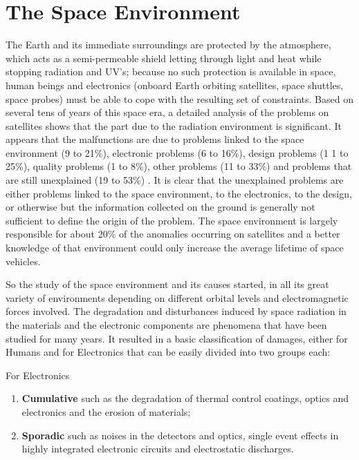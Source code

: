 \documentclass[./dissertation.tex]{subfiles}
\begin{document}
\section{The Space Environment}
The Earth and its immediate surroundings are protected by the atmosphere, which acts as a semi-permeable shield letting through light and heat while stopping radiation and UV's; because no such protection is available in space, human beings and electronics (onboard Earth orbiting satellites, space shuttles, space probes) must be able to cope with the resulting set of constraints. Based on several tens  of years of this  space  era, a detailed analysis of the problems on satellites shows that the part due to the radiation  environment  is  significant. It appears  that  the malfunctions   are   due to problems   linked to the   space environment (9 to 21\%), electronic  problems (6 to 16\%), design  problems (1 1  to 25\%), quality  problems  (1 to 8\%), other   problems (11  to   33\%) and  problems   that are still unexplained (19 to  53\%) \cite{bib2}.  It is clear  that the unexplained problems  are either problems  linked to the space environment, to the electronics, to   the design, or otherwise   but   the information  collected  on  the  ground is generally not sufficient to define the origin  of  the  problem. The space environment is largely  responsible   for   about 20\% of the anomalies  occurring  on  satellites  and a  better  knowledge of that  environment  could  only  increase  the  average lifetime of space vehicles.

So the study of the space environment and its causes started, in all its great variety of environments depending on different orbital levels and electromagnetic forces involved. The  degradation  and  disturbances induced by space radiation in the materials  and the  electronic  components are phenomena that  have  been  studied for many  years.\cite{bib2} It resulted in a basic classification of damages, either for Humans and for Electronics that can be easily divided into two groups each:

For Electronics
\begin{enumerate}
    \item \textbf{Cumulative}  such  as the degradation  of thermal control coatings, optics  and  electronics  and  the  erosion  of materials;
    \item \textbf{Sporadic}  such as noises in the  detectors  and optics,   single  event  effects in highly  integrated  electronic circuits and electrostatic discharges.
\end{enumerate}
\end{document}
